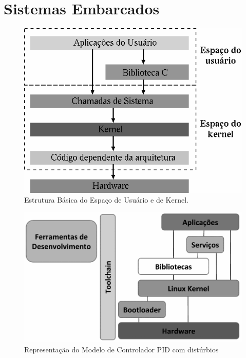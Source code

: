 \section{Sistemas Embarcados}

\begin{figure}[htb]
  \caption{Estrutura Básica do Espaço de Usuário e de Kernel.}
  \begin{center}
      \includegraphics[scale=0.75]{img/kernel_user_space}
  \end{center}
  \label{fig:kernel_user_space}
\end{figure}


\begin{figure}[htb]
  \caption{Representação do Modelo de Controlador PID com distúrbios}
  \begin{center}
      \includegraphics[scale=0.35]{img/sistema-linux-overview_embarcados}
  \end{center}
  \label{fig:sistema-linux-overview_embarcados}
\end{figure}

